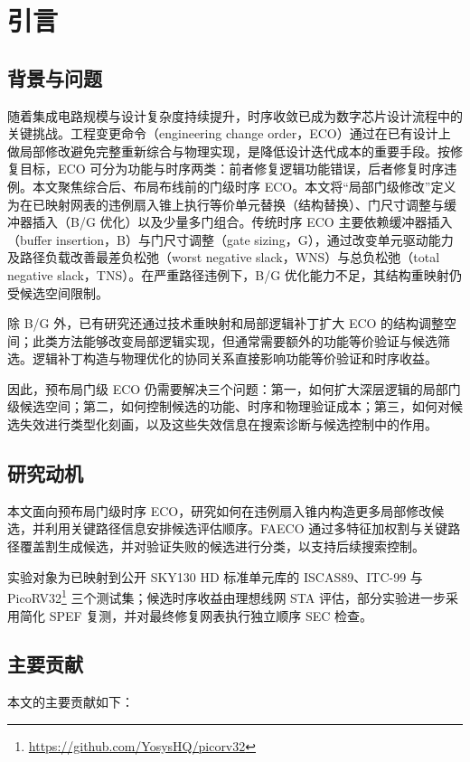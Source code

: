 \documentclass[twocolumn,10pt,fontset=windows]{ctexart}
\begin{document}
\section{引言}

\subsection{背景与问题}
随着集成电路规模与设计复杂度持续提升，时序收敛已成为数字芯片设计流程中的关键挑战。工程变更命令（engineering change order，ECO）通过在已有设计上做局部修改避免完整重新综合与物理实现，是降低设计迭代成本的重要手段。按修复目标，ECO 可分为功能与时序两类：前者修复逻辑功能错误，后者修复时序违例。本文聚焦综合后、布局布线前的门级时序 ECO。本文将“局部门级修改”定义为在已映射网表的违例扇入锥上执行等价单元替换（结构替换）、门尺寸调整与缓冲器插入（B/G 优化）以及少量多门组合。传统时序 ECO 主要依赖缓冲器插入（buffer insertion，B）与门尺寸调整（gate sizing，G），通过改变单元驱动能力及路径负载改善最差负松弛（worst negative slack，WNS）与总负松弛（total negative slack，TNS）。在严重路径违例下，B/G 优化能力不足，其结构重映射仍受候选空间限制\cite{ho2010eco,liu2021rlsizer,chen2024aito}。

除 B/G 外，已有研究还通过技术重映射和局部逻辑补丁扩大 ECO 的结构调整空间；此类方法能够改变局部逻辑实现，但通常需要额外的功能等价验证与候选筛选。逻辑补丁构造与物理优化的协同关系直接影响功能等价验证和时序收益。

因此，预布局门级 ECO 仍需要解决三个问题：第一，如何扩大深层逻辑的局部门级候选空间；第二，如何控制候选的功能、时序和物理验证成本；第三，如何对候选失效进行类型化刻画，以及这些失效信息在搜索诊断与候选控制中的作用。
\subsection{研究动机}
本文面向预布局门级时序 ECO，研究如何在违例扇入锥内构造更多局部修改候选，并利用关键路径信息安排候选评估顺序。FAECO 通过多特征加权割与关键路径覆盖割生成候选，并对验证失败的候选进行分类，以支持后续搜索控制。

实验对象为已映射到公开 SKY130 HD 标准单元库的 ISCAS89\cite{iscas89}、ITC-99\cite{itc99} 与 PicoRV32\footnote{\url{https://github.com/YosysHQ/picorv32}} 三个测试集；候选时序收益由理想线网 STA 评估，部分实验进一步采用简化 SPEF 复测，并对最终修复网表执行独立顺序 SEC 检查。

\subsection{主要贡献}
本文的主要贡献如下：
\end{document}
